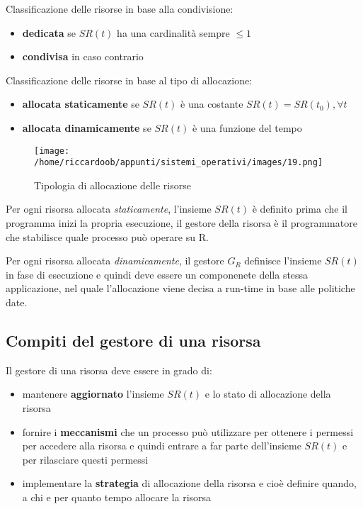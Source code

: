 Classificazione delle risorse in base alla condivisione:
\begin{itemize}
    \item \textbf{dedicata} se $SR(t)$ ha una cardinalità sempre $\le 1$
    \item \textbf{condivisa} in caso contrario
\end{itemize}

Classificazione delle risorse in base al tipo di allocazione:
\begin{itemize}
    \item \textbf{allocata staticamente} se $SR(t)$ è una costante $SR(t) = SR(t_0), \forall t$ 
    \item \textbf{allocata dinamicamente} se $SR(t)$ è una funzione del tempo
\end{itemize}
\begin{figure}[H]
    \caption{Tipologia di allocazione delle risorse}
    \centering
    \texttt{[image: /home/riccardoob/appunti/sistemi\_operativi/images/19.png]}
\end{figure}

Per ogni risorsa allocata \textit{staticamente}, l'insieme $SR(t)$ è definito prima che il programma inizi la propria esecuzione, il gestore della risorsa è il programmatore che stabilisce quale processo può operare su R.

Per ogni risorsa allocata \textit{dinamicamente}, il gestore $G_R$ definisce l'insieme $SR(t)$ in fase di esecuzione e quindi deve essere un componenete della stessa applicazione, nel quale l'allocazione viene decisa a run-time in base alle politiche date.

\subsection{Compiti del gestore di una risorsa}
Il gestore di una risorsa deve essere in grado di:
\begin{itemize}
    \item mantenere \textbf{aggiornato} l'insieme $SR(t)$ e lo stato di allocazione della risorsa
    \item fornire i \textbf{meccanismi} che un processo può utilizzare per ottenere i permessi per accedere alla risorsa e quindi entrare a far parte dell'insieme $SR(t)$ e per rilasciare questi permessi
    \item implementare la \textbf{strategia} di allocazione della risorsa e cioè definire quando, a chi e per quanto tempo allocare la risorsa
\end{itemize}

